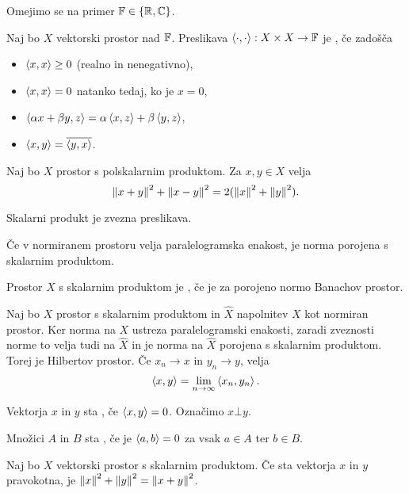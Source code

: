 
Omejimo se na primer $\mathbb{F} \in \{\mathbb{R}, \mathbb{C}\}$.

\begin{definicija}
  Naj bo $X$ vektorski prostor nad $\mathbb{F}$.
  Preslikava $\left< \cdot, \cdot \right> : X \times X \to \mathbb{F}$ je , če zadošča
  \begin{itemize}
  \item $\left< x,x \right> \ge 0$ (realno in nenegativno),
  \item $\left< x,x \right> = 0$ natanko tedaj, ko je $x = 0$,
  \item $\left< \alpha x + \beta y, z \right> = \alpha \left< x,z \right> + \beta \left< y,z \right>$,
  \item $\left< x,y \right> = \overline{\left< y,x \right>}$.
  \end{itemize}
\end{definicija}

\begin{trditev}
  Naj bo $X$ prostor s polskalarnim produktom.
  Za $x, y \in X$ velja
  \[
	\left\lVert x+y\right\rVert^2 + \left\lVert x-y\right\rVert^2 = 2 (\left\lVert x\right\rVert^2 + \left\lVert y\right\rVert^2).
  \]
\end{trditev}

\begin{trditev}
  Skalarni produkt je zvezna preslikava.
\end{trditev}

\begin{izrek}
  Če v normiranem prostoru velja paralelogramska enakost, je norma porojena s
  skalarnim produktom.
\end{izrek}

\begin{definicija}
  Prostor $X$ s skalarnim produktom je , če je za
  porojeno normo Banachov prostor.
\end{definicija}

Naj bo $X$ prostor s skalarnim produktom in $\hat{X}$ napolnitev $X$ kot
normiran prostor.
Ker norma na $X$ ustreza paralelogramski enakosti, zaradi zveznosti norme to
velja tudi na $\hat{X}$ in je norma na $\hat{X}$ porojena s skalarnim produktom.
Torej je Hilbertov prostor.
Če $x_n \to x$ in $y_n \to y$, velja
\[
  \left< x,y \right> = \lim_{n \to \infty} \left< x_n, y_n \right>.
\]

\begin{definicija}
  Vektorja $x$ in $y$ sta , če $\left< x,y \right> = 0$.
  Označimo $x \bot y$.
\end{definicija}

\begin{definicija}
  Množici $A$ in $B$ sta , če je $\left< a,b \right> = 0$ za vsak $a \in
  A$ ter $b \in B$.
\end{definicija}

\begin{izrek}[Pitagora]
  Naj bo $X$ vektorski prostor s skalarnim produktom.
  Če sta vektorja $x$ in $y$ pravokotna, je $\left\lVert x\right\rVert^2 + \left\lVert y\right\rVert^2 =
  \left\lVert x+y\right\rVert^2$.
\end{izrek}

